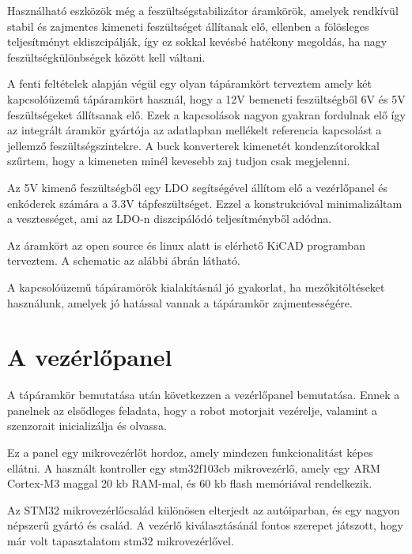 Használható eszközök még a feszültségstabilizátor áramkörök, amelyek rendkívül
stabil és zajmentes kimeneti feszültséget állítanak elő, ellenben a fölösleges
teljesítményt eldiszcipálják, így ez sokkal kevésbé hatékony megoldás, ha nagy
feszültségkülönbségek között kell váltani.

A fenti feltételek alapján végül egy olyan tápáramkört terveztem amely két
kapcsolóüzemű tápáramkört használ, hogy a 12V bemeneti feszültségből 6V és 5V
feszültségeket állítsanak elő. Ezek a kapcsolások nagyon gyakran fordulnak elő
így az integrált áramkör gyártója az adatlapban mellékelt referencia kapcsolást
a jellemző feszültségszintekre. A buck konverterek kimenetét kondenzátorokkal
szűrtem, hogy a kimeneten minél kevesebb zaj tudjon csak megjelenni.

Az 5V kimenő feszültségből egy LDO segítségével állítom elő a vezérlőpanel és
enkóderek számára a 3.3V tápfeszültséget. Ezzel a konstrukcióval minimalizáltam
a vesztességet, ami az LDO-n diszcipálódó teljesítményből adódna. 

Az áramkört az open source és linux alatt is elérhető KiCAD programban
terveztem. A schematic az alábbi ábrán látható.

A kapcsolóüzemű tápáramörök kialakításnál jó gyakorlat, ha mezőkitöltéseket
használunk, amelyek jó hatással vannak a tápáramkör zajmentességére.


\section{A vezérlőpanel}

A tápáramkör bemutatása után következzen a vezérlőpanel bemutatása. Ennek a
panelnek az elsődleges feladata, hogy a robot motorjait vezérelje, valamint
a szenzorait inicializálja és olvassa.

Ez a panel egy mikrovezérlőt hordoz, amely mindezen funkcionalitást képes
ellátni. A használt kontroller egy stm32f103cb mikrovezérlő, amely egy
ARM Cortex-M3 maggal 20 kb RAM-mal, és 60 kb flash memóriával rendelkezik.

Az STM32 mikrovezérlőcsalád különösen elterjedt az autóiparban, és egy
nagyon népszerű gyártó és család. A vezérlő kiválasztásánál fontos szerepet
játszott, hogy már volt tapasztalatom stm32 mikrovezérlővel.

